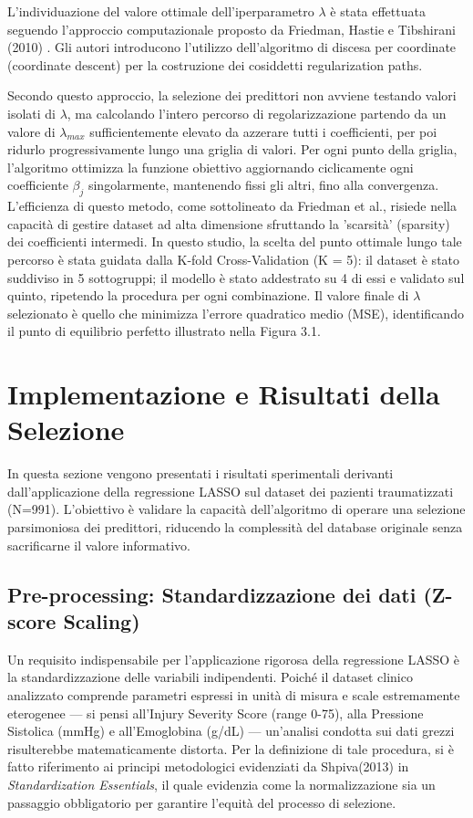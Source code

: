 \documentclass[11pt, oneside, noexaminfo]{sapthesis}   	%
\begin{document}
L'individuazione del valore ottimale dell'iperparametro $\lambda$ è stata effettuata seguendo l'approccio computazionale proposto da Friedman, Hastie e Tibshirani (2010) \cite{friedman2010regularization}. Gli autori introducono l'utilizzo dell'algoritmo di discesa per coordinate (coordinate descent) per la costruzione dei cosiddetti regularization paths.

Secondo questo approccio, la selezione dei predittori non avviene testando valori isolati di $\lambda$, ma calcolando l'intero percorso di regolarizzazione partendo da un valore di $\lambda_{max}$ sufficientemente elevato da azzerare tutti i coefficienti, per poi ridurlo progressivamente lungo una griglia di valori. Per ogni punto della griglia, l'algoritmo ottimizza la funzione obiettivo aggiornando ciclicamente ogni coefficiente $\beta_j$ singolarmente, mantenendo fissi gli altri, fino alla convergenza.\\

L'efficienza di questo metodo, come sottolineato da Friedman et al., risiede nella capacità di gestire dataset ad alta dimensione sfruttando la 'scarsità' (sparsity) dei coefficienti intermedi. In questo studio, la scelta del punto ottimale lungo tale percorso è stata guidata dalla K-fold Cross-Validation (K = 5): il dataset è stato suddiviso in 5 sottogruppi; il modello è stato addestrato su 4 di essi e validato sul quinto, ripetendo la procedura per ogni combinazione. Il valore finale di $\lambda$ selezionato è quello che minimizza l'errore quadratico medio (MSE), identificando il punto di equilibrio perfetto illustrato nella Figura 3.1.   
    
\section{Implementazione e Risultati della Selezione}
In questa sezione vengono presentati i risultati sperimentali derivanti dall'applicazione della regressione LASSO sul dataset dei pazienti traumatizzati (N=991). L'obiettivo è validare la capacità dell'algoritmo di operare una selezione parsimoniosa dei predittori, riducendo la complessità del database originale senza sacrificarne il valore informativo.

\subsection{Pre-processing: Standardizzazione dei dati (Z-score Scaling)}

Un requisito indispensabile per l'applicazione rigorosa della regressione LASSO è la standardizzazione delle variabili indipendenti. Poiché il dataset clinico analizzato comprende parametri espressi in unità di misura e scale estremamente eterogenee — si pensi all'Injury Severity Score (range 0-75), alla Pressione Sistolica (mmHg) e all'Emoglobina (g/dL) — un'analisi condotta sui dati grezzi risulterebbe matematicamente distorta. Per la definizione di tale procedura, si è fatto riferimento ai principi metodologici evidenziati da Shpiva(2013) in \textit{Standardization Essentials}, il quale evidenzia come la normalizzazione sia un passaggio obbligatorio per garantire l'equità del processo di selezione.\\
\end{document}
